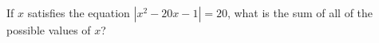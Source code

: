If $x$ satisfies the equation $\left|x^2-20x-1\right|=20$, what is the sum of all of the possible values of $x$?
